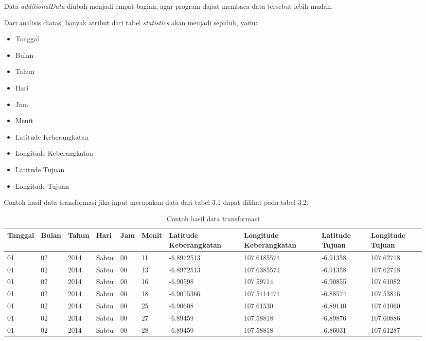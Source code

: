Data \textsl{additionalData} diubah menjadi empat bagian, agar program dapat membaca data tersebut lebih mudah.

Dari analisis diatas, banyak atribut dari tabel \textsl{statistics} akan menjadi sepuluh, yaitu:
\begin{itemize}
	\item Tanggal
	\item Bulan
	\item Tahun
	\item Hari
	\item Jam
	\item Menit
	\item Latitude Keberangkatan
	\item Longitude Keberangkatan
	\item Latitude Tujuan
	\item Longitude Tujuan
\end{itemize}

Contoh hasil data transformasi jika input merupakan data dari tabel 3.1 dapat dilihat pada tabel 3.2.

\begin{table}[h]
\caption{Contoh hasil data transformasi}
\begin{tabular}{|l|l|l|l|l|l|l|l|l|l|}
\hline
\textbf{Tanggal}	& \textbf{Bulan}	& \textbf{Tahun} 	& \textbf{Hari} & \textbf{Jam}	& \textbf{Menit} & \textbf{Latitude Keberangkatan} & \textbf{Longitude Keberangkatan} & \textbf{Latitude Tujuan} & \textbf{Longitude Tujuan}      \\ \hline
01				         	& 02								& 2014						& Sabtu         & 00         	& 11						 & -6.8972513										 & 107.6185574 							  & -6.91358                & 107.62718 \\ \hline
01				         	& 02								& 2014						& Sabtu         & 00         	& 13						 & -6.8972513										 & 107.6385574                & -6.91358							  & 107.62718 \\ \hline
01				          & 02								& 2014						& Sabtu         & 00         	& 16						 & -6.90598											 & 107.59714     		  				& -6.90855						&107.61082 \\ \hline
01				          & 02								& 2014						& Sabtu         & 00         	& 18						 & -6.9015366										 & 107.5414474 								& -6.88574					    & 107.53816 \\ \hline
01				          & 02								& 2014						& Sabtu         & 00         	& 25						 & -6.90608										   & 107.61530     						  & -6.89140					 &107.61060 \\ \hline
01				          & 02								& 2014						& Sabtu         & 00         	& 27						 & -6.89459											 & 107.58818     							& -6.89876						&107.60886 \\ \hline
01				          & 02								& 2014						& Sabtu         & 00         	& 28						 & -6.89459											 &107.58818  								   & -6.86031					 &107.61287 \\ \hline
\end{tabular}
\end{table} 

